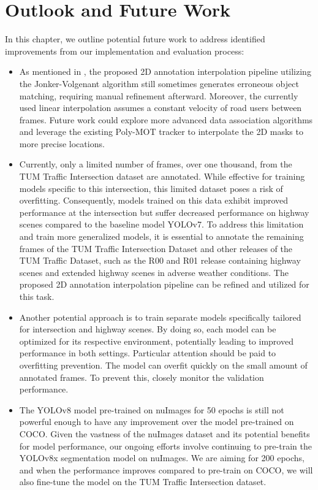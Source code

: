 \chapter{Outlook and Future Work}  \label{chap:eight}%

In this chapter, we outline potential future work to address identified improvements from our implementation and evaluation process: 

\begin{itemize}
	\item As mentioned in , the proposed 2D annotation interpolation pipeline utilizing the Jonker-Volgenant algorithm still sometimes generates erroneous object matching, requiring manual refinement afterward. Moreover, the currently used linear interpolation assumes a constant velocity of road users between frames. Future work could explore more advanced data association algorithms and leverage the existing Poly-MOT tracker to interpolate the 2D masks to more precise locations.
	
	\item Currently, only a limited number of frames, over one thousand, from the TUM Traffic Intersection dataset are annotated. While effective for training models specific to this intersection, this limited dataset poses a risk of overfitting. Consequently, models trained on this data exhibit improved performance at the intersection but suffer decreased performance on highway scenes compared to the baseline model YOLOv7. To address this limitation and train more generalized models, it is essential to annotate the remaining frames of the TUM Traffic Intersection Dataset and other releases of the TUM Traffic Dataset, such as the R00 and R01 release containing highway scenes and extended highway scenes in adverse weather conditions. The proposed 2D annotation interpolation pipeline can be refined and utilized for this task. 
	
	\item Another potential approach is to train separate models specifically tailored for intersection and highway scenes. By doing so, each model can be optimized for its respective environment, potentially leading to improved performance in both settings. Particular attention should be paid to overfitting prevention. The model can overfit quickly on the small amount of annotated frames. To prevent this, closely monitor the validation performance.
	
	\item The YOLOv8 model pre-trained on nuImages for 50 epochs is still not powerful enough to have any improvement over the model pre-trained on COCO. Given the vastness of the nuImages dataset and its potential benefits for model performance, our ongoing efforts involve continuing to pre-train the YOLOv8x segmentation model on nuImages. We are aiming for 200 epochs, and when the performance improves compared to pre-train on COCO, we will also fine-tune the model on the TUM Traffic Intersection dataset. 
	

\end{itemize}
